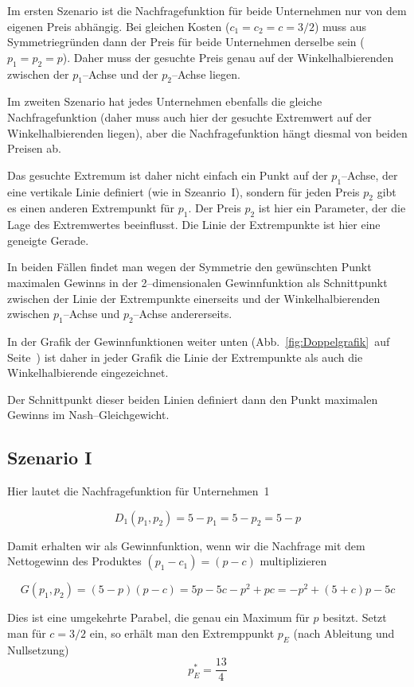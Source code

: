 \documentclass[paper=a4,notitlepage,parskip=half,plainheadsepline]{scrartcl}
\begin{document}
Im ersten Szenario ist die Nachfragefunktion für beide Unternehmen nur von dem eigenen Preis abhängig.
Bei gleichen Kosten ($c_1=c_2=c=3/2$) muss aus Symmetriegründen dann der Preis für beide Unternehmen derselbe sein ($p_1=p_2=p$).
Daher muss der gesuchte Preis genau auf der Winkelhalbierenden zwischen der $p_1$--Achse und der $p_2$--Achse liegen.

Im zweiten Szenario hat jedes Unternehmen ebenfalls die gleiche Nachfragefunktion (daher muss auch hier der gesuchte Extremwert auf der Winkelhalbierenden liegen), aber die Nachfragefunktion hängt diesmal von beiden Preisen ab.

Das gesuchte Extremum ist daher nicht einfach ein Punkt auf der $p_1$--Achse, der eine vertikale Linie definiert (wie in Szeanrio~I), 
sondern für jeden Preis $p_2$ gibt es einen anderen Extrempunkt für $p_1$. Der Preis $p_2$ ist hier ein Parameter, der die Lage des Extremwertes beeinflusst.
Die Linie der Extrempunkte ist hier eine geneigte Gerade.

In beiden Fällen findet man wegen der Symmetrie den gewünschten Punkt maximalen Gewinns in der 2--dimensionalen Gewinnfunktion als 
Schnittpunkt zwischen der Linie der Extrempunkte einerseits und der Winkelhalbierenden zwischen $p_1$--Achse und $p_2$--Achse andererseits.

 In der Grafik der Gewinnfunktionen weiter unten (Abb.~\ref{fig:Doppelgrafik}~auf Seite~\pageref{fig:Doppelgrafik}) ist daher in jeder Grafik die Linie der Extrempunkte als auch die Winkelhalbierende eingezeichnet.

 Der Schnittpunkt dieser beiden Linien definiert dann den Punkt maximalen Gewinns im Nash--Gleichgewicht.

\subsection{Szenario I}
Hier lautet die Nachfragefunktion für Unternehmen~1

$$D_1(p_1,p_2)= 5-p_1 = 5-p_2 = 5-p$$

Damit erhalten wir als Gewinnfunktion, wenn wir die Nachfrage mit dem Nettogewinn des Produktes \linebreak[5] $(p_1-c_1)=(p-c)$ multiplizieren

$$G(p_1,p_2) = (5-p) (p-c) = 5p -5c -p^2 +pc = -p^2 + (5+c)p -5c$$

Dies ist eine umgekehrte Parabel, die genau ein Maximum für $p$ besitzt. Setzt man für $c=3/2$ ein, so erhält man
den Extremppunkt $p_E$ (nach Ableitung und Nullsetzung)
$$ p^*_E = \frac{13}{4}$$
\end{document}
